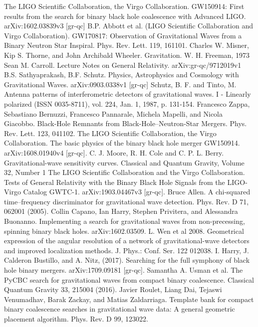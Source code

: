 \documentclass[binding=0.6cm, LaM]{sapthesis}
\begin{document}
\begin{thebibliography}{500}
	 The LIGO Scientific Collaboration, the Virgo Collaboration. GW150914: First results from the search for binary black hole coalescence with Advanced LIGO. arXiv:1602.03839v3 [gr-qc]
         B.P. Abbott et al. (LIGO Scientific Collaboration and Virgo Collaboration). GW170817: Observation of Gravitational Waves from a Binary Neutron Star Inspiral. Phys. Rev. Lett. 119, 161101.	
	 Charles W. Misner, Kip S. Thorne, and John Archibald Wheeler. Gravitation. W. H. Freeman, 1973
	 Sean M. Carroll. Lecture Notes on General Relativity. arXiv:gr-qc/9712019v1
	 B.S. Sathyaprakash, B.F. Schutz. Physics, Astrophysics and Cosmology with Gravitational Waves. arXiv:0903.0338v1 [gr-qc]
	 Schutz, B. F. and Tinto, M. Antenna patterns of interferometric detectors of gravitational waves. I - Linearly polarized (ISSN 0035-8711), vol. 224, Jan. 1, 1987, p. 131-154.
	 Francesco Zappa, Sebastiano Bernuzzi, Francesco Pannarale, Michela Mapelli, and Nicola Giacobbo. Black-Hole Remnants from Black-Hole–Neutron-Star Mergers. Phys. Rev. Lett. 123, 041102. 
	 The LIGO Scientific Collaboration, the Virgo Collaboration. The basic physics of the binary black hole merger GW150914. arXiv:1608.01940v4 [gr-qc].
	 C. J. Moore, R. H. Cole and C. P. L. Berry. Gravitational-wave sensitivity curves. Classical and Quantum Gravity, Volume 32, Number 1
	 The LIGO Scientific Collaboration and the Virgo Collaboration. Tests of General Relativity with the Binary Black Hole Signals from the LIGO-Virgo Catalog GWTC-1. arXiv:1903.04467v3 [gr-qc].
	 Bruce Allen. A chi-squared time–frequency discriminator for gravitational wave detection. Phys. Rev. D 71, 062001 (2005).
  	 Collin Capano, Ian Harry, Stephen Privitera, and Alessandra Buonanno. Implementing a search for gravitational waves from non-precessing, spinning binary black holes. arXiv:1602.03509.
  	 L. Wen et al 2008. Geometrical expression of the angular resolution of a network of gravitational-wave detectors and improved localization methods. J. Phys.: Conf. Ser. 122 012038.
	 I. Harry, J. Calderon Bustillo, and A. Nitz, (2017). Searching for the full symphony of black hole binary mergers. arXiv:1709.09181 [gr-qc]. 
  	 Samantha A. Usman et al. The PyCBC search for gravitational waves from compact binary coalescence.  Classical Quantum Gravity 33, 215004 (2016). 
  	 Javier Roulet, Liang Dai, Tejaswi Venumadhav, Barak Zackay, and Matias Zaldarriaga. Template bank for compact binary coalescence searches in gravitational wave data: A general geometric placement algorithm. Phys. Rev. D 99, 123022. 

\end{thebibliography}
\end{document}
